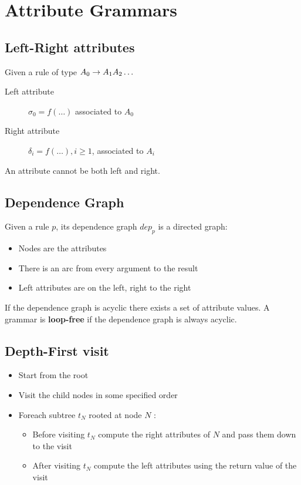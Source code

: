 \section{Attribute Grammars}

\subsection{Left-Right attributes}
Given a rule of type $A_0 \rightarrow A_1A_2\ldots$

\begin{description}
    \item[Left attribute] $\sigma_0 = f(\ldots)$ associated to $A_0$
    \item[Right attribute] $\delta_i = f(\ldots), i \ge 1$, associated to $A_i$
\end{description}

An attribute cannot be both left and right.

\subsection{Dependence Graph}

Given a rule $p$, its dependence graph $dep_p$ is a directed graph:
\begin{itemize}
    \item Nodes are the attributes
    \item There is an arc from every argument to the result
    \item Left attributes are on the left, right to the right
\end{itemize}

If the dependence graph is acyclic there exists a set of attribute values. A grammar is \textbf{loop-free} if the dependence graph is always acyclic.

\subsection{Depth-First visit}
\begin{itemize}
    \item Start from the root
    \item Visit the child nodes in some specified order
    \item Foreach subtree $t_N$ rooted at node $N$ :
    \begin{itemize}
        \item Before visiting $t_N$ compute the right attributes of $N$ and pass them down to the visit
        \item After visiting $t_N$ compute the left attributes using the return value of the visit
    \end{itemize}
\end{itemize}

